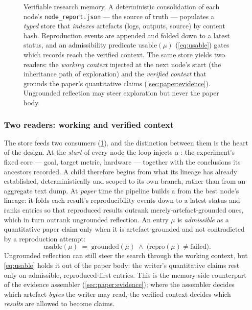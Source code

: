\begin{figure}[t]
  \centering
  \resizebox{0.92\columnwidth}{!}{}
  \caption{Verifiable research memory. A deterministic consolidation of
           each node's \texttt{node\_report.json} --- the source of truth
           --- populates a \emph{typed} store that \emph{indexes}
           artefacts (logs, outputs, source) by content hash. Reproduction
           events are appended and folded down to a latest status, and an
           admissibility predicate $\mathrm{usable}(\mu)$ (\cref{eq:usable})
           gates which records reach the verified context. The same store
           yields two readers: the \emph{working context} injected at the
           next node's start (the inheritance path of exploration) and the
           \emph{verified context} that grounds the paper's quantitative
           claims (\cref{sec:paper:evidence}). Ungrounded reflection may
           steer exploration but never the paper body.}
  \label{fig:research-memory}
\end{figure}

\subsubsection*{Two readers: working and verified context}

The store feeds two consumers (\cref{fig:research-memory}), and the
distinction between them is the heart of the design. At the \emph{start}
of every node the loop injects a : the experiment's
fixed core --- goal, target metric, hardware --- together with the
conclusions its ancestors recorded. A child therefore begins from what
its lineage has already established, deterministically and scoped to its
own branch, rather than from an aggregate text dump. At \emph{paper} time
the pipeline builds a  from the best node's
lineage: it folds each result's reproducibility events down to a latest
status and ranks entries so that reproduced results outrank
merely-artefact-grounded ones, which in turn outrank ungrounded
reflection. An entry $\mu$ is \emph{admissible} as a quantitative paper
claim only when it is artefact-grounded and not contradicted by a
reproduction attempt:
\begin{equation}\label{eq:usable}
  \mathrm{usable}(\mu) \;=\;
    \mathrm{grounded}(\mu)\;\wedge\;
    \bigl(\mathrm{repro}(\mu)\neq\mathrm{failed}\bigr).
\end{equation}
Ungrounded reflection can still steer the search through the working
context, but \cref{eq:usable} holds it out of the paper body: the
writer's quantitative claims rest only on admissible, reproduced-first
entries. This is the memory-side counterpart of the evidence assembler
(\cref{sec:paper:evidence}); where the assembler decides which artefact
\emph{bytes} the writer may read, the verified context decides which
\emph{results} are allowed to become claims.

